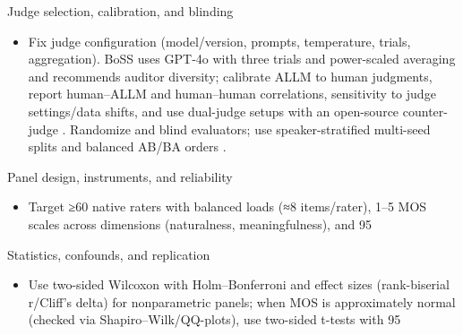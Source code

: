 Judge selection, calibration, and blinding
\begin{itemize}
  \item Fix judge configuration (model/version, prompts, temperature, trials, aggregation). BoSS uses GPT‑4o with three trials and power-scaled averaging and recommends auditor diversity; calibrate ALLM to human judgments, report human–ALLM and human–human correlations, sensitivity to judge settings/data shifts, and use dual-judge setups with an open-source counter-judge \cite{wang2025bossbeyondsemanticspeech}. Randomize and blind evaluators; use speaker-stratified multi-seed splits and balanced AB/BA orders \cite{vashishth2024stabspeechtokenizerassessmentbenchmark,chen2023reducingbarriersselfsupervisedlearninghu}.
\end{itemize}

Panel design, instruments, and reliability
\begin{itemize}
  \item Target ≥60 native raters with balanced loads (≈8 items/rater), 1–5 MOS scales across dimensions (naturalness, meaningfulness), and 95%
\end{itemize}

Statistics, confounds, and replication
\begin{itemize}
  \item Use two-sided Wilcoxon with Holm–Bonferroni and effect sizes (rank-biserial r/Cliff’s delta) for nonparametric panels; when MOS is approximately normal (checked via Shapiro–Wilk/QQ-plots), use two-sided t-tests with 95%
\end{itemize}

